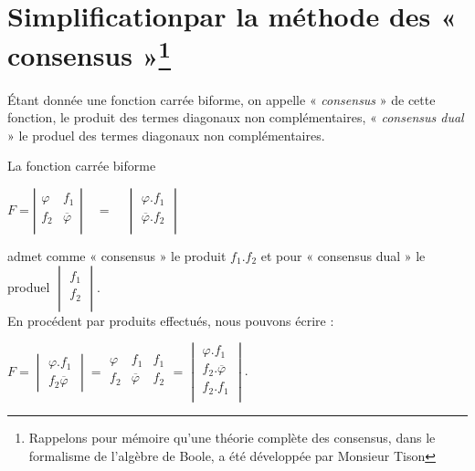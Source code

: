 \section{Simplificationpar la méthode des « consensus »\protect \footnote{Rappelons pour mémoire qu'une théorie complète des consensus, dans le formalisme de l'algèbre de {\sc Boole}, a été développée par Monsieur Tison}}

Étant donnée une fonction carrée biforme, on appelle « \textsl{consensus} » de cette fonction, le produit des termes diagonaux non complémentaires, « \textsl{consensus dual} » le produel des termes diagonaux non complémentaires. 

\bigskip

La fonction carrée biforme 

\medskip

  \centerline{$
   F =      \left| \begin{array}{c|c} 
                                     \varphi  & f_1 \\
                                      f_2 & \overline{\varphi} \\
                                \end{array} \right| 
                                    \quad = \quad 
                  \begin{vmatrix}  {\varphi} . f_1  \\
                                 \overline{ \varphi} . f_2   \\
               \end{vmatrix}
$}

admet comme « consensus » le produit $f_1 . f_2$ et pour « consensus dual » le produel  $\begin{vmatrix} f_1 \\f_2 \\ \end{vmatrix}$. \\ 
En procédent par produits effectués, nous pouvons écrire : 


\bigskip 

\centerline{ $ F = \begin{vmatrix}
\varphi . f_1 \\ f_2 \overline{\varphi}
\end{vmatrix} 
       = \begin{array}{|c|c|c|} 
           \varphi & f_1 & f_1 \\
            f_2 & \overline{\varphi} & f_2 \\
           \end{array} 
             = \begin{vmatrix}
               \varphi . f_1 \\
               f_2 .   \overline{\varphi}  \\
               f_2 . f_1 \\           
             \end{vmatrix}
$.}

